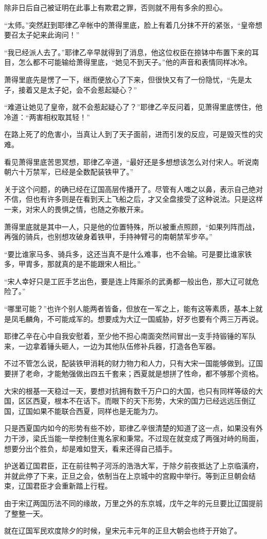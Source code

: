 除非日后自己被证明在此事上有欺君之罪，否则就不用有多余的担心。

“太师。”突然赶到耶律乙辛帐中的萧得里底，脸上有着几分抹不开的紧张，“皇帝想要召太子妃来此询问！”

“我已经派人去了。”耶律乙辛早就得到了消息，他这位权臣在捺钵中布置下来的耳目，怎么都不可能输给萧得里底，“她见不到天子。”他的声音和表情同样冰冷。

萧得里底先是愣了一下，继而便放心了下来，但很快又有了一份隐忧，“先是太子，接着又是太子妃，会不会惹起疑心？”

“难道让她见了皇帝，就不会惹起疑心了？”耶律乙辛反问着，见萧得里底愣住，他冷道：“两害相权取其轻！”

在路上死了的危害小，当真让人到了天子面前，进而引发的反应，可是毁灭性的灾难。

看见萧得里底苦思冥想，耶律乙辛道，“最好还是多想想该怎么对付宋人。听说南朝六十万禁军，已经是全数配装铁甲了。”

关于这个问题，的确已经在辽国高层传播开了。尽管有人嗤之以鼻，表示自己绝对不信，但也有许多则是在看到天上飞船之后，才又全盘接受了这种说法。只是这样一来，对宋人的畏惧之情，也随之弥散开来。

萧得里底就是其中一人，只是他的位置特殊，所以被重点照顾，“如果列阵而战，再强的骑兵，也别想攻破身着铁甲，手持神臂弓的南朝禁军步卒。”

“要比谁家马多、骑兵多，这还当真不是什么难事，也不会输。可是要比谁家铁多，甲胄多，那就真的是不能跟宋人相比。”

“宋人幸好只是工匠手艺出色，要是连上阵厮杀的武勇都一般出色，那大辽可就危险了。”

“哪里可能？”也许个别人能两者皆备，但放在一军之上，能有这等素质，基本上就是凤毛麟角，不可能成军的。想要成为大辽一国威胁，好歹也要有个两三万再说。

耶律乙辛在心中自我安慰着，至少他不担心南面突然间冒出一支手持锻锤的军队来，一边拿着锤头砸人，一边为其他队伍修补兵器，打造各色军器。

不过不管怎么说，配装铁甲消耗的财力物力和人力，只有大宋一国能够做到。辽国要拼了老命，才能勉强做出四五千套来；西夏就是想拼了性命，都不够那个资格。

大宋的根基一天稳过一天，要想对抗拥有数千万户口的大国，也只有同样等级的大国，区区西夏，根本不在话下。而眼下的天下形势，大宋的国力已经远远压倒辽国，辽国如果不能联合西夏，同样也是无能为力。

只是西夏国内如今的形势有些不妙，耶律乙辛很清楚的知道了这一点，如果没有外力干涉，梁氏当能一举控制住嵬名家和秉常。不过现在就变成了两强对峙的局面，想要分出个胜负，却是难如登天，看来还得自己插手。

护送着辽国君臣，正在前往鸭子河泺的浩浩大军，于除夕前夜抵达了上京临潢府，并就此停了下来，正旦之会，依制当在上京城中的宫殿中举行。等到正旦朝会结束，辽国君臣才会重新踏上行程。

由于宋辽两国历法不同的缘故，万里之外的东京城，戊午之年的元旦要比辽国提前了整整一天。

就在辽国军民欢度除夕的时候，皇宋元丰元年的正旦大朝会也终于开始了。

